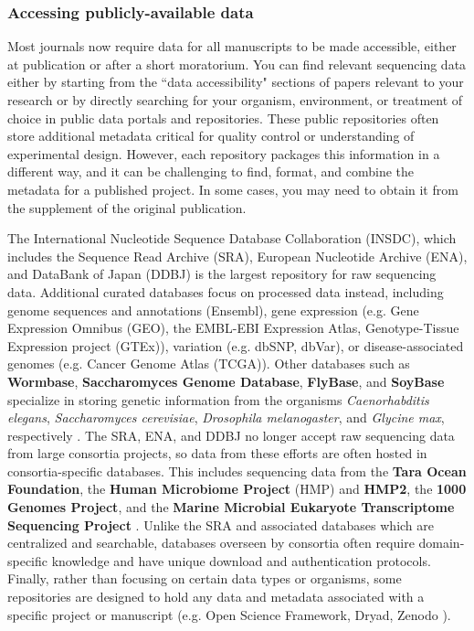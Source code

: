 \documentclass[10pt,letterpaper]{article}
\begin{document}
\subsubsection*{Accessing publicly-available data}

Most journals now require data for all manuscripts to be made accessible, either at publication or after a short moratorium.
You can find relevant sequencing data either by starting from the ``data accessibility" sections of papers relevant to your research or by directly searching for your organism, environment, or treatment of choice in public data portals and repositories. 
These public repositories often store additional metadata critical for quality control or understanding of experimental design. However, each repository packages this information in a different way, and it can be challenging to find, format, and combine the metadata for a published project. In some cases, you may need to obtain it from the supplement of the original publication.

The International Nucleotide Sequence Database Collaboration (INSDC), which includes the Sequence Read Archive (SRA), European Nucleotide Archive (ENA), and DataBank of Japan (DDBJ) is the largest repository for raw sequencing data. 
Additional curated databases focus on processed data instead, including genome sequences and annotations (Ensembl), gene expression (e.g. Gene Expression Omnibus (GEO), the EMBL-EBI Expression Atlas, Genotype-Tissue Expression project (GTEx)), variation (e.g. dbSNP, dbVar), or disease-associated genomes (e.g. Cancer Genome Atlas (TCGA)).
Other databases such as \textbf{Wormbase}, \textbf{Saccharomyces Genome Database}, \textbf{FlyBase}, and \textbf{SoyBase} specialize in storing genetic information from the organisms \textit{Caenorhabditis elegans}, \textit{Saccharomyces cerevisiae}, \textit{Drosophila melanogaster}, and \textit{Glycine max}, respectively \cite{harris2020wormbase, cherry2012saccharomyces, st2014flybase, grant2010soybase}. 
The SRA, ENA, and DDBJ no longer accept raw sequencing data from large consortia projects, so data from these efforts are often hosted in consortia-specific databases. 
This includes sequencing data from the \textbf{Tara Ocean Foundation}, the \textbf{Human Microbiome Project} (HMP) and \textbf{HMP2}, the \textbf{1000 Genomes Project}, and the \textbf{Marine Microbial Eukaryote Transcriptome Sequencing Project} \cite{pesant2015open, turnbaugh2007human, integrative2014integrative, clarke20121000, keeling2014marine}. 
Unlike the SRA and associated databases which are centralized and searchable, databases overseen by consortia often require domain-specific knowledge and have unique download and authentication protocols.
Finally, rather than focusing on certain data types or organisms, some repositories are designed to hold any data and metadata associated with a specific project or manuscript (e.g. Open Science Framework, Dryad, Zenodo \cite{foster2017open}).
\end{document}

